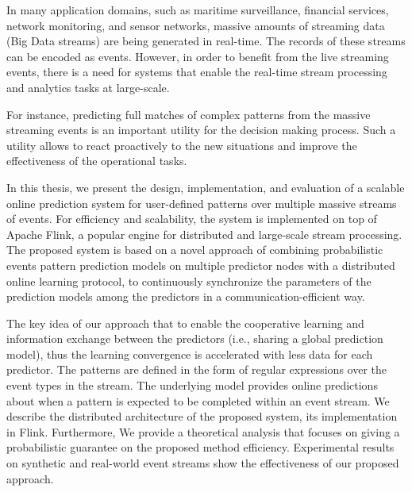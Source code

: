 
\par In many application domains, such as maritime surveillance, financial services, network monitoring, and sensor networks, massive amounts of streaming data (Big Data streams) are being generated in real-time. The records of these streams can be encoded as events.  However, in order to benefit from the live streaming events, there is a need for systems that enable the real-time stream  processing and analytics tasks at large-scale.

 
 For instance, predicting full matches of complex patterns from the massive streaming events is an important utility for the decision making process. Such a utility allows to react proactively to the new situations and improve the effectiveness of the operational tasks.

\par In this thesis, we present the design, implementation, and evaluation of a scalable online prediction system for user-defined patterns over multiple massive streams of events. For efficiency and scalability, the system is implemented on top of Apache Flink, a popular engine for distributed and large-scale stream processing. The proposed system is based on a novel approach of combining probabilistic events pattern prediction models on multiple predictor nodes with a distributed online learning protocol, to continuously synchronize the parameters of the prediction models among the predictors in a communication-efficient way. 

\par  The key idea of our approach that to enable the cooperative learning and information exchange between the predictors (i.e., sharing a global prediction model), thus the learning convergence is accelerated with less data for each predictor. The patterns are defined in the form of regular expressions over the event types in the stream. The underlying model provides online predictions about when a pattern is expected to be completed within an event stream. We describe the distributed architecture of the proposed system, its implementation in Flink.  Furthermore, We provide a theoretical analysis that focuses on giving a probabilistic guarantee on the proposed method efficiency.  Experimental results on synthetic and real-world event streams show the effectiveness of our proposed approach.

